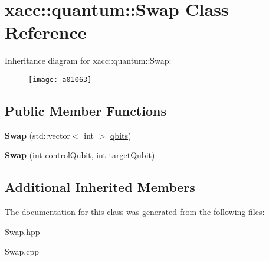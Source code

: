 \hypertarget{a01063}{}\section{xacc\+:\+:quantum\+:\+:Swap Class Reference}
\label{a01063}
Inheritance diagram for xacc\+:\+:quantum\+:\+:Swap\+:\begin{figure}[H]
\begin{center}
\leavevmode
\texttt{[image: a01063]}
\end{center}
\end{figure}
\subsection*{Public Member Functions}
\begin{DoxyCompactItemize}
\item 
\mbox{\label{a01063_a5c35a23a635f235a5615be65e769c121}} 
{\bfseries Swap} (std\+::vector$<$ int $>$ \hyperlink{a01015_a2a56be6c2519ea65df4d06f4abae1393}{qbits})
\item 
\mbox{\label{a01063_ac19efe303b798e14441a2c235b5ba7f3}} 
{\bfseries Swap} (int control\+Qubit, int target\+Qubit)
\end{DoxyCompactItemize}
\subsection*{Additional Inherited Members}


The documentation for this class was generated from the following files\+:\begin{DoxyCompactItemize}
\item 
Swap.\+hpp\item 
Swap.\+cpp\end{DoxyCompactItemize}
